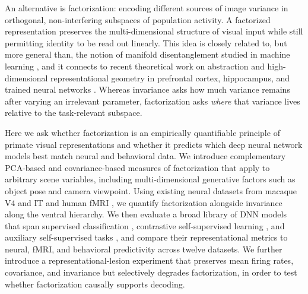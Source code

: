 An alternative is factorization: encoding different sources of image variance in orthogonal, non-interfering subspaces of population activity. A factorized representation preserves the multi-dimensional structure of visual input while still permitting identity to be read out linearly. This idea is closely related to, but more general than, the notion of manifold disentanglement studied in machine learning \cite{higgins2017beta}, and it connects to recent theoretical work on abstraction and high-dimensional representational geometry in prefrontal cortex, hippocampus, and trained neural networks \cite{bernardi2020geometry,rigotti2013importance,fusi2016why,stringer2019high,sorscher2022neural}. Whereas invariance asks how much variance remains after varying an irrelevant parameter, factorization asks \emph{where} that variance lives relative to the task-relevant subspace.

Here we ask whether factorization is an empirically quantifiable principle of primate visual representations and whether it predicts which deep neural network models best match neural and behavioral data. We introduce complementary PCA-based and covariance-based measures of factorization that apply to arbitrary scene variables, including multi-dimensional generative factors such as object pose and camera viewpoint. Using existing neural datasets from macaque V4 and IT \cite{majaj2015simple,hong2016explicit,rajalingham2018large} and human fMRI \cite{khalighrazavi2014deep}, we quantify factorization alongside invariance along the ventral hierarchy. We then evaluate a broad library of DNN models that span supervised classification \cite{krizhevsky2012imagenet,he2016deep}, contrastive self-supervised learning \cite{chen2020simple,he2020momentum}, and auxiliary self-supervised tasks \cite{zhuang2021unsupervised}, and compare their representational metrics to neural, fMRI, and behavioral predictivity across twelve datasets. We further introduce a representational-lesion experiment that preserves mean firing rates, covariance, and invariance but selectively degrades factorization, in order to test whether factorization causally supports decoding.


